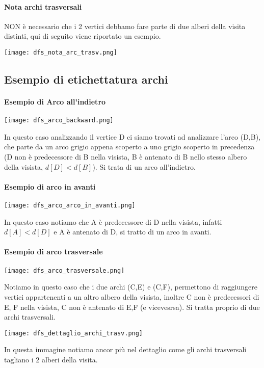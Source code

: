 \paragraph*{Nota archi trasversali} NON è necessario che i 2 vertici debbamo fare parte
di due alberi della visita distinti, qui di seguito viene riportato un esempio.
\begin{center}
    \texttt{[image: dfs\_nota\_arc\_trasv.png]}
\end{center}
\subsection{Esempio di etichettatura archi}
\paragraph*{Esempio di Arco all'indietro}
\begin{center}
    \texttt{[image: dfs\_arco\_backward.png]}
\end{center}
In questo caso analizzando il vertice D ci siamo trovati ad analizzare l'arco (D,B),
che parte da un arco grigio appena scoperto a uno grigio scoperto in precedenza (D non
è predecessore di B nella visista, B è antenato di B nello stesso albero della visista,
$d[D] < d[B]$). Si trata di un arco all'indietro.
\paragraph*{Esempio di arco in avanti}
\begin{center}
    \texttt{[image: dfs\_arco\_arco\_in\_avanti.png]}
\end{center}
In questo caso notiamo che A è predecessore di D nella visista, infatti $d[A] < d[D]$ e
A è antenato di D, si tratto di un arco in avanti.\\
\paragraph*{Esempio di arco trasversale}
\begin{center}
    \texttt{[image: dfs\_arco\_trasversale.png]}
\end{center}
Notiamo in questo caso che i due archi (C,E) e (C,F), permettono di raggiungere vertici
appartenenti a un altro albero della visista, inoltre C non è predecessori di E, F nella
visista, C non è antenato di E,F (e vicevesrsa). Si tratta proprio di due archi trasversali.
\begin{center}
    \texttt{[image: dfs\_dettaglio\_archi\_trasv.png]}
\end{center}
In questa immagine notiamo ancor più nel dettaglio come gli archi trasversali tagliano i
2 alberi della visita.

